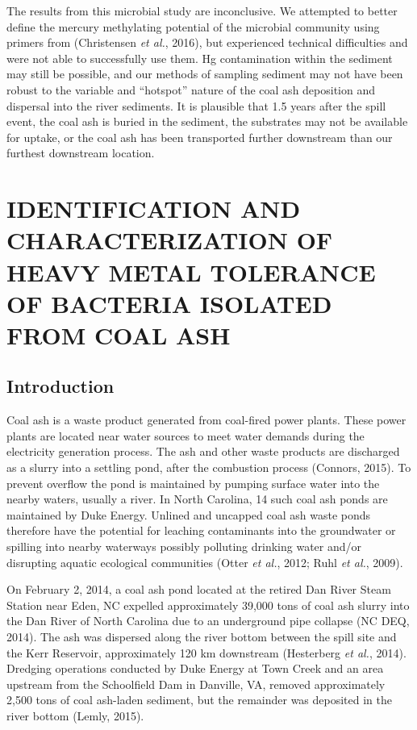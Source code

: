 \documentclass[ms, hidelinks]{uncgdissertationexp3}
\theoremstyle{plain}
\theoremstyle{definition}
\theoremstyle{remark}
\begin{document}
The results from this microbial study are inconclusive. We attempted to better define the mercury methylating potential of the microbial community using primers from (Christensen \emph{et al.}, 2016), but experienced technical difficulties and were not able to successfully use them. Hg contamination within the sediment may still be possible, and our methods of sampling sediment may not have been robust to the variable and ``hotspot'' nature of the coal ash deposition and dispersal into the river sediments. It is plausible that 1.5 years after the spill event, the coal ash is buried in the sediment, the substrates may not be available for uptake, or the coal ash has been transported further downstream than our furthest downstream location.

\chapter{IDENTIFICATION AND CHARACTERIZATION OF HEAVY METAL TOLERANCE OF BACTERIA ISOLATED FROM COAL ASH}\label{metal}
\section{Introduction}\label{introduction-1}

Coal ash is a waste product generated from coal-fired power plants. These power plants are located near water sources to meet water demands during the electricity generation process. The ash and other waste products are discharged as a slurry into a settling pond, after the combustion process (Connors, 2015). To prevent overflow the pond is maintained by pumping surface water into the nearby waters, usually a river. In North Carolina, 14 such coal ash ponds are maintained by Duke Energy. Unlined and uncapped coal ash waste ponds therefore have the potential for leaching contaminants into the groundwater or spilling into nearby waterways possibly polluting drinking water and/or disrupting aquatic ecological communities (Otter \emph{et al.}, 2012; Ruhl \emph{et al.}, 2009).

On February 2, 2014, a coal ash pond located at the retired Dan River Steam Station near Eden, NC expelled approximately 39,000 tons of coal ash slurry into the Dan River of North Carolina due to an underground pipe collapse (NC DEQ, 2014). The ash was dispersed along the river bottom between the spill site and the Kerr Reservoir, approximately 120 km downstream (Hesterberg \emph{et al.}, 2014). Dredging operations conducted by Duke Energy at Town Creek and an area upstream from the Schoolfield Dam in Danville, VA, removed approximately 2,500 tons of coal ash-laden sediment, but the remainder was deposited in the river bottom (Lemly, 2015).
\end{document}
